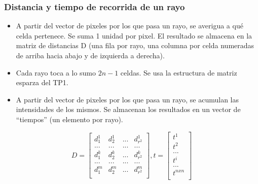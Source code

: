 \documentclass[11pt]{beamer}
\begin{document}
\begin{frame}
\frametitle{Distancia y tiempo de recorrida de un rayo}
\begin{itemize}
\item A partir del vector de pixeles por los que pasa un rayo, se averigua a qué celda pertenece. Se suma 1 unidad por pixel. El resultado se almacena en la matriz de distancias D (una fila por rayo, una columna por celda numeradas de arriba hacia abajo y de izquierda a derecha).
\item Cada rayo toca a lo sumo $2n-1$ celdas. Se usa la estructura de matriz esparza del TP1.
\item A partir del vector de pixeles por los que pasa un rayo, se acumulan las intensidades de los mismos. Se almacenan los resultados en un vector de “tiempos” (un elemento por rayo).
\end{itemize}
$$
D = \left[
\begin{array}{cccc}
d^1_1 & d^1_2 & ... & d^1_{r^2} \\
... & ... & ... & ... \\
d^k_1 & d^k_2 & ... & d^k_{r^2} \\
... & ... & ... & ... \\
d^m_1 & d^m_2 & ... & d^m_{r^2} \\
\end{array}
\right]
,
t=\left[
\begin{array}{c}
t^1 \\
t^2 \\
... \\
t^i \\
... \\
t^{nxn} \\
\end{array}
\right]
$$
\end{frame}


\end{document}
